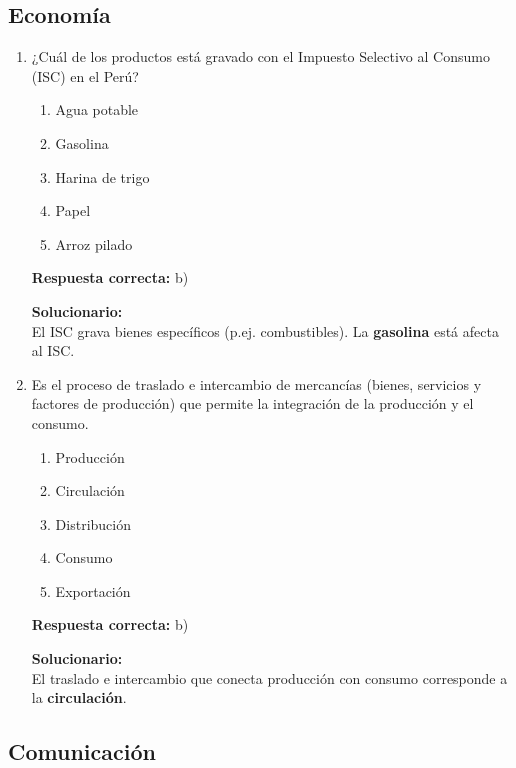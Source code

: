\subsection*{Economía}

\begin{enumerate}


\item ¿Cuál de los productos está gravado con el Impuesto Selectivo al Consumo (ISC) en el Perú?
\begin{enumerate}[label=\alph*)]
	\item Agua potable
	\item Gasolina
	\item Harina de trigo
	\item Papel
	\item Arroz pilado
\end{enumerate}

\textbf{Respuesta correcta:} b)

\vspace{2mm}
\textbf{Solucionario:}\\
El ISC grava bienes específicos (p.ej. combustibles). La \textbf{gasolina} está afecta al ISC.

\item  Es el proceso de traslado e intercambio de mercancías (bienes, servicios y factores de producción) que permite la integración de la producción y el consumo.
\begin{enumerate}[label=\alph*)]
	\item Producción
	\item Circulación
	\item Distribución
	\item Consumo
	\item Exportación
\end{enumerate}

\textbf{Respuesta correcta:} b)

\vspace{2mm}
\textbf{Solucionario:}\\
El traslado e intercambio que conecta producción con consumo corresponde a la \textbf{circulación}.


\end{enumerate}


\subsection*{Comunicación}

